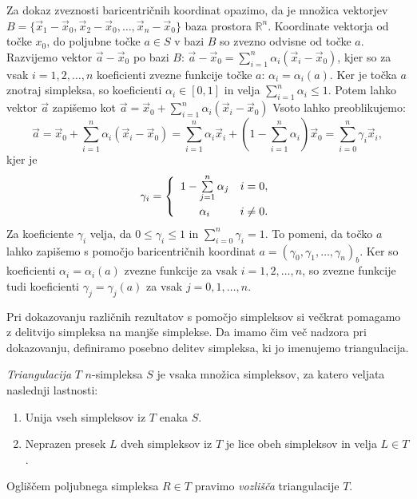 \documentclass[mat1]{fmfdelo}
\newcommand{\R}{\mathbb R}
\newcommand{\0}{\underline{0}}
\begin{document}
\begin{dokaz}
Za dokaz zveznosti baricentričnih koordinat opazimo, da je množica vektorjev $B = \{ \vec{x}_1 - \vec{x}_0, \vec{x}_2 - \vec{x}_0, \dots, \vec{x}_{n} - \vec{x}_0 \}$ baza prostora $\R^n$. Koordinate vektorja od točke $x_0$, do poljubne točke $a \in S$ v bazi $B$ so zvezno odvisne od  točke $a$. Razvijemo vektor $\vec{a} - \vec{x}_0$ po bazi $B$: $\vec{a} - \vec{x}_0 = \sum\limits_{i=1}^n \alpha_i (\vec{x}_i - \vec{x}_0)$, kjer so za vsak $i = 1, 2, \dots, n$ koeficienti zvezne funkcije točke $a$: $\alpha_i = \alpha_i(a)$. Ker je točka $a$ znotraj simpleksa, so koeficienti $\alpha_i \in [0, 1]$ in velja $\sum\limits_{i=1}^n \alpha_i \leq 1$. Potem lahko vektor $\vec{a}$ zapišemo kot $\vec{a}= \vec{x}_0 + \sum\limits_{i=1}^n \alpha_i (\vec{x}_i - \vec{x}_0)$ Vsoto lahko preoblikujemo:
$$\vec{a}= \vec{x}_0 +  \sum_{i=1}^n \alpha_i (\vec{x}_i - \vec{x}_0) = \sum_{i=1}^n \alpha_i \vec{x}_i +(1 - \sum_{i=1}^n \alpha_i ) \vec{x}_0 = \sum_{i=0}^n \gamma_i \vec{x}_i,$$
kjer je
\[  \gamma_i =  \left\{
\begin{array}{cl}\vspace{3pt}
	1 -\sum\limits_{j=1}^n \alpha_j & i = 0,\\
	\alpha_i & i \neq 0. \\
\end{array} 
\right. \]
Za koeficiente $\gamma_i$ velja, da $0 \leq \gamma_i \leq 1$ in $\sum\limits_{i=0}^n \gamma_i = 1$. To pomeni, da točko $a$ lahko zapišemo s pomočjo baricentričnih koordinat $a = (\gamma_0, \gamma_1, \dots, \gamma_n)_b$. Ker so koeficienti $\alpha_i = \alpha_i(a)$ zvezne funkcije za vsak $i = 1, 2, \dots, n$, so zvezne funkcije tudi koeficienti $\gamma_j = \gamma_j(a)$ za vsak $j = 0, 1, \dots, n$.
\end{dokaz}
Pri dokazovanju različnih rezultatov s pomočjo simpleksov si večkrat pomagamo z delitvijo simpleksa na manjše simplekse. Da imamo čim več nadzora pri dokazovanju, definiramo posebno delitev simpleksa, ki jo imenujemo triangulacija.

\begin{definicija}
\emph{Triangulacija} $T$ $n$-simpleksa $S$ je vsaka množica simpleksov, za katero veljata naslednji lastnosti:
\begin{enumerate}
\item Unija vseh simpleksov iz $T$ enaka $S$.
\item Neprazen presek $L$ dveh simpleksov iz $T$ je lice obeh simpleksov in velja $L \in T$.
\end{enumerate}
Ogliščem poljubnega simpleksa $R \in T$ pravimo \emph{vozlišča} triangulacije $T$.
\end{definicija}
\end{document}

